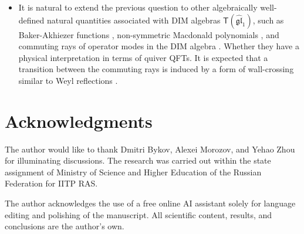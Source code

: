 \documentclass[10pt]{article}
\theoremstyle{definition}
\def\fg{\mathfrak{g}}
\def\fl{\mathfrak{l}}
\def\myY{{\mathsf{Y}}}
\def\myT{{\mathsf{T}}}
\numberwithin{equation}{section}
\begin{document}
\begin{itemize}
	The stable basis for $\mbox{$\myY$}(\widehat{\fg\fl}_1)$ is known \cite{MO} to correspond to Schur polynomials.
	In other words, for $\mbox{$\myY$}(\widehat{\fg\fl}_1)$, the matrix $U$ describes a transition from Jack to Schur polynomials.
	This transition is well known to be triangular, and so is $U$.
	Othertriangular matrices map all the mentioned polynomials to so-called symmetrized monomials; the corresponding matrix coefficients have the combinatorial meaning of Kostka numbers, or of Kostka functions in general.
	It would be interesting to learn whether the basis of Schur polynomials has a distinguished meaning in intrinsically physical terms, and whether triangular matrices of Kostka numbers admit a geometric interpretation in terms of stable envelopes or a physical interpretation in terms of tunneling amplitudes.
	\item It is natural to extend the previous question to other algebraically well-defined natural quantities associated with DIM algebras $\myT(\widehat{\fg\fl}_1)$, such as Baker-Akhiezer functions \cite{Mironov:2024tlc}, non-symmetric Macdonald polynomials \cite{Mironov:2025yak}, and commuting rays of operator modes in the DIM algebra \cite{Mironov:2020pcd,Mironov:2023wga}.
	Whether they have a physical interpretation in terms of quiver QFTs.
	It is expected that a transition between the commuting rays is induced by a form of wall-crossing \cite{Smirnov:2019abc} similar to Weyl reflections \cite{Galakhov:2026cwv}.
\end{itemize}





\section*{Acknowledgments}

The author would like to thank Dmitri Bykov, Alexei Morozov, and Yehao Zhou for illuminating discussions.
The research was carried out within the state
assignment of Ministry of Science and Higher Education of the Russian Federation for IITP RAS.

The author acknowledges the use of a free online AI assistant
solely for language editing and polishing of the manuscript. 
All scientific content, results, and conclusions are the author's own.






\end{document}
